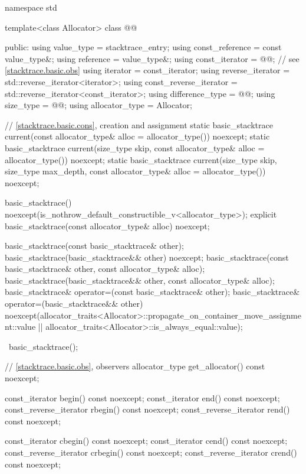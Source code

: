 \begin{codeblock}
namespace std {
  template<class Allocator>
  class @@ {
  public:
    using value_type = stacktrace_entry;
    using const_reference = const value_type&;
    using reference = value_type&;
    using const_iterator = @@;  // see \ref{stacktrace.basic.obs}
    using iterator = const_iterator;
    using reverse_iterator = std::reverse_iterator<iterator>;
    using const_reverse_iterator = std::reverse_iterator<const_iterator>;
    using difference_type = @@;
    using size_type = @@;
    using allocator_type = Allocator;

    // \ref{stacktrace.basic.cons}, creation and assignment
    static basic_stacktrace current(const allocator_type& alloc = allocator_type()) noexcept;
    static basic_stacktrace current(size_type skip,
                                    const allocator_type& alloc = allocator_type()) noexcept;
    static basic_stacktrace current(size_type skip, size_type max_depth,
                                    const allocator_type& alloc = allocator_type()) noexcept;

    basic_stacktrace() noexcept(is_nothrow_default_constructible_v<allocator_type>);
    explicit basic_stacktrace(const allocator_type& alloc) noexcept;

    basic_stacktrace(const basic_stacktrace& other);
    basic_stacktrace(basic_stacktrace&& other) noexcept;
    basic_stacktrace(const basic_stacktrace& other, const allocator_type& alloc);
    basic_stacktrace(basic_stacktrace&& other, const allocator_type& alloc);
    basic_stacktrace& operator=(const basic_stacktrace& other);
    basic_stacktrace& operator=(basic_stacktrace&& other)
      noexcept(allocator_traits<Allocator>::propagate_on_container_move_assignment::value ||
        allocator_traits<Allocator>::is_always_equal::value);

    ~basic_stacktrace();

    // \ref{stacktrace.basic.obs}, observers
    allocator_type get_allocator() const noexcept;

    const_iterator begin() const noexcept;
    const_iterator end() const noexcept;
    const_reverse_iterator rbegin() const noexcept;
    const_reverse_iterator rend() const noexcept;

    const_iterator cbegin() const noexcept;
    const_iterator cend() const noexcept;
    const_reverse_iterator crbegin() const noexcept;
    const_reverse_iterator crend() const noexcept;

}}
\end{codeblock}
